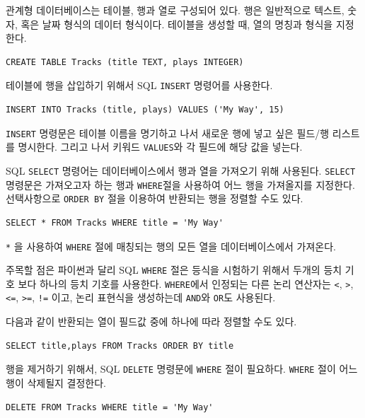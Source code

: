 관계형 데이터베이스는 테이블, 행과 열로 구성되어 있다. 행은 일반적으로 텍스트, 숫자, 혹은 날짜 형식의 데이터 형식이다.
테이블을 생성할 때, 열의 명칭과 형식을 지정한다.

\beforeverb
\begin{verbatim}
CREATE TABLE Tracks (title TEXT, plays INTEGER)
\end{verbatim}
\afterverb
%

테이블에 행을 삽입하기 위해서 SQL {\tt INSERT} 명령어를 사용한다.

\beforeverb
\begin{verbatim}
INSERT INTO Tracks (title, plays) VALUES ('My Way', 15)
\end{verbatim}
\afterverb
%

{\tt INSERT} 명령문은 테이블 이름을 명기하고 나서 새로운 행에 넣고 싶은 필드/행 리스트를 명시한다.
그리고 나서 키워드 {\tt VALUES}와 각 필드에 해당 값을 넣는다.

SQL {\tt SELECT} 명령어는 데이터베이스에서 행과 열을 가져오기 위해 사용된다.
{\tt SELECT} 명령문은 가져오고자 하는 행과 {\tt WHERE}절을 사용하여 어느 행을 가져올지를 지정한다.
선택사항으로 {\tt ORDER BY} 절을 이용하여 반환되는 행을 정렬할 수도 있다.

\beforeverb
\begin{verbatim}
SELECT * FROM Tracks WHERE title = 'My Way'
\end{verbatim}
\afterverb
%

\verb"*" 을 사용하여 {\tt WHERE} 절에 매칭되는 행의 모든 열을 데이터베이스에서 가져온다.

주목할 점은 파이썬과 달리 SQL {\tt WHERE} 절은 등식을 시험하기 위해서 두개의 등치 기호 보다 하나의 등치 기호를 사용한다.
{\tt WHERE}에서 인정되는 다른 논리 연산자는 
\verb"<",
\verb">",
\verb"<=",
\verb">=",
\verb"!=" 이고, 논리 표현식을 생성하는데 {\tt AND}와 {\tt OR}도 사용된다.

다음과 같이 반환되는 열이 필드값 중에 하나에 따라 정렬할 수도 있다.

\beforeverb
\begin{verbatim}
SELECT title,plays FROM Tracks ORDER BY title
\end{verbatim}
\afterverb
%

행을 제거하기 위해서, SQL {\tt DELETE} 명령문에 {\tt WHERE} 절이 필요하다.
{\tt WHERE} 절이 어느 행이 삭제될지 결정한다.

\beforeverb
\begin{verbatim}
DELETE FROM Tracks WHERE title = 'My Way'
\end{verbatim}
\afterverb
%

